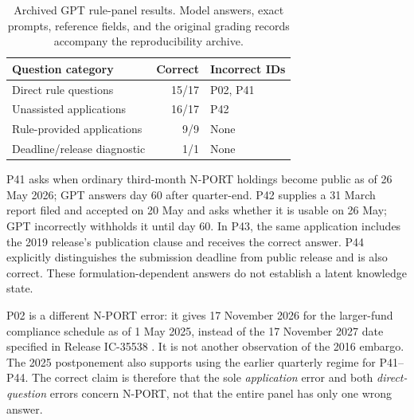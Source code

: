 \documentclass[10pt,twocolumn,a4paper]{article}
\begin{document}
\begin{table}[htbp]
\centering\small
\begin{tabular}{lrl}
\toprule
Question category & Correct & Incorrect IDs\\
\midrule
Direct rule questions & 15/17 & P02, P41\\
Unassisted applications & 16/17 & P42\\
Rule-provided applications & 9/9 & None\\
Deadline/release diagnostic & 1/1 & None\\
\bottomrule
\end{tabular}
\caption{Archived GPT rule-panel results. Model answers, exact prompts, reference fields, and the original grading records accompany the reproducibility archive.}
\label{tab:qa}
\end{table}

P41 asks when ordinary third-month N-PORT holdings become public as of 26 May 2026; GPT answers day 60 after quarter-end. P42 supplies a 31 March report filed and accepted on 20 May and asks whether it is usable on 26 May; GPT incorrectly withholds it until day 60. In P43, the same application includes the 2019 release's publication clause and receives the correct answer. P44 explicitly distinguishes the submission deadline from public release and is also correct. These formulation-dependent answers do not establish a latent knowledge state.

P02 is a different N-PORT error: it gives 17 November 2026 for the larger-fund compliance schedule as of 1 May 2025, instead of the 17 November 2027 date specified in Release IC-35538 \citep{sec2025delay}. It is not another observation of the 2016 embargo. The 2025 postponement also supports using the earlier quarterly regime for P41--P44. The correct claim is therefore that the sole \emph{application} error and both \emph{direct-question} errors concern N-PORT, not that the entire panel has only one wrong answer.
\end{document}
